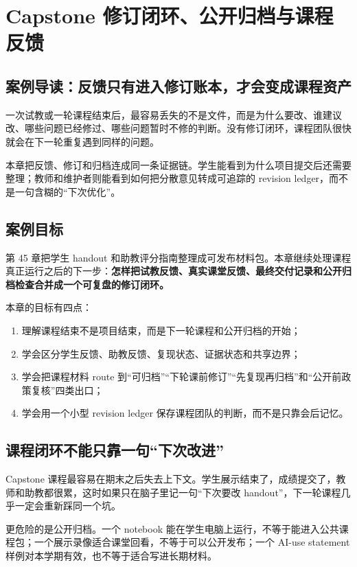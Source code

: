 \chapter{Capstone 修订闭环、公开归档与课程反馈}

\section{案例导读：反馈只有进入修订账本，才会变成课程资产}

一次试教或一轮课程结束后，最容易丢失的不是文件，而是为什么要改、谁建议改、哪些问题已经修过、哪些问题暂时不修的判断。没有修订闭环，课程团队很快就会在下一轮重复遇到同样的问题。

本章把反馈、修订和归档连成同一条证据链。学生能看到为什么项目提交后还需要整理；教师和维护者则能看到如何把分散意见转成可追踪的 revision ledger，而不是一句含糊的“下次优化”。

\section{案例目标}

第 45 章把学生 handout 和助教评分指南整理成可发布材料包。本章继续处理课程真正运行之后的下一步：\textbf{怎样把试教反馈、真实课堂反馈、最终交付记录和公开归档检查合并成一个可复盘的修订闭环。}

本章的目标有四点：

\begin{enumerate}
    \item 理解课程结束不是项目结束，而是下一轮课程和公开归档的开始；
    \item 学会区分学生反馈、助教反馈、复现状态、证据状态和共享边界；
    \item 学会把课程材料 route 到“可归档”“下轮课前修订”“先复现再归档”和“公开前政策复核”四类出口；
    \item 学会用一个小型 revision ledger 保存课程团队的判断，而不是只靠会后记忆。
\end{enumerate}

\section{课程闭环不能只靠一句“下次改进”}

Capstone 课程最容易在期末之后失去上下文。学生展示结束了，成绩提交了，教师和助教都很累，这时如果只在脑子里记一句“下次要改 handout”，下一轮课程几乎一定会重新踩同一个坑。

更危险的是公开归档。一个 notebook 能在学生电脑上运行，不等于能进入公共课程包；一个展示录像适合课堂回看，不等于可以公开发布；一个 AI-use statement 样例对本学期有效，也不等于适合写进长期材料。

